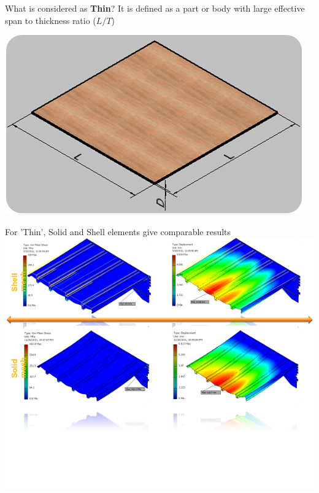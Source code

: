 \begin{frame}{What is considered as {\bf Thin}?}
It is defined as a part or body with large effective span to  thickness ratio ($L/T$)

\includegraphics[scale=0.25]{../Common/images/WhatIsThin.png}

For 'Thin', Solid and Shell elements give comparable results
\includegraphics[scale=0.25]{../Common/images/ShellSolid.png}


\end{frame}

%
%
%
%
%

